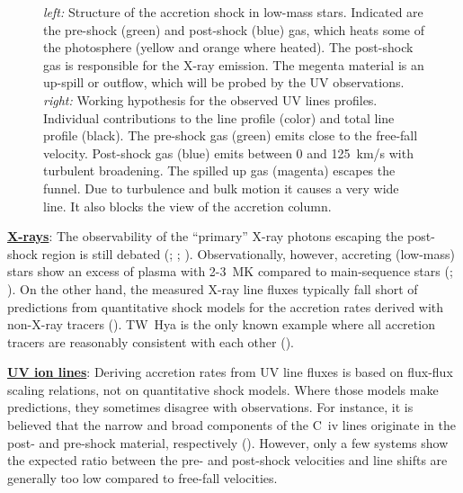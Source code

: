 \documentclass[letterpaper,11pt,twocolumn]{article}
\begin{document}
\begin{figure}
\centering
{}
\caption{\label{fig:CIVsketch} \emph{left:} Structure of the accretion
  shock in low-mass stars. Indicated are the pre-shock (green) and
  post-shock (blue) gas, which heats some of the photosphere (yellow
  and orange where heated). The post-shock gas is responsible for the
  X-ray emission. The megenta material is an up-spill or outflow,
  which will be probed by the UV observations.  
  \emph{right:}
  Working hypothesis for the observed UV lines profiles.
  Individual contributions to the line profile (color) and total line
  profile (black). 
  The pre-shock gas (green) emits close
  to the free-fall velocity. Post-shock gas (blue) emits
  between 0 and 125~km/s with turbulent broadening. The
  spilled up gas (magenta) escapes the funnel. Due to turbulence and bulk
  motion it causes a very wide line. It also blocks the view of
  the accretion column. 
  }
\end{figure}


\underline{\bf X-rays}: The observability of the ``primary'' X-ray photons 
escaping the post-shock region is still debated 
(; ; ). Observationally, 
however, accreting (low-mass) stars show  an excess of plasma with 2-3~MK
compared to main-sequence stars (; ).
On the other hand, the measured X-ray line fluxes typically fall short of
predictions from quantitative shock models for the accretion rates derived with non-X-ray tracers (). TW~Hya is the only known example where all accretion tracers are reasonably consistent with each other (). 


\underline{\bf UV ion lines}:  Deriving  accretion rates from UV line fluxes is based 
on flux-flux scaling relations, not on quantitative shock models. Where those models make predictions, they sometimes disagree with observations. For instance, it is believed that the  narrow and 
broad components of the C~{\sc iv} lines  originate in the post- and 
pre-shock material, respectively (). However, only a few systems show the
expected ratio between the pre- and post-shock velocities and line
shifts are generally too low compared to free-fall velocities. 
\end{document}

